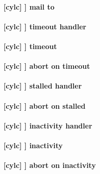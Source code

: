 \paragraph[mail to]{[cylc] \textrightarrow [[events]] \textrightarrow mail to}

\paragraph[timeout handler]{[cylc] \textrightarrow [[events]] \textrightarrow timeout handler}

\paragraph[timeout]{[cylc] \textrightarrow [[events]] \textrightarrow timeout}

\paragraph[abort on timeout]{[cylc] \textrightarrow [[events]] \textrightarrow abort on timeout}

\paragraph[stalled handler]{[cylc] \textrightarrow [[events]] \textrightarrow stalled handler}

\paragraph[abort on stalled]{[cylc] \textrightarrow [[events]] \textrightarrow abort on stalled}

\paragraph[inactivity handler]{[cylc] \textrightarrow [[events]] \textrightarrow inactivity handler}

\paragraph[inactivity]{[cylc] \textrightarrow [[events]] \textrightarrow inactivity}

\paragraph[abort on inactivity]{[cylc] \textrightarrow [[events]] \textrightarrow abort on inactivity}

